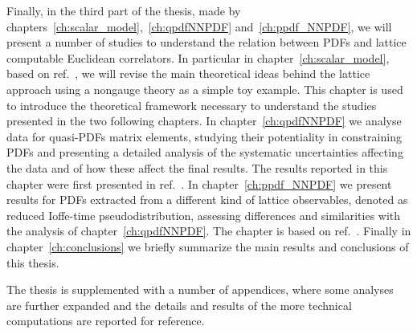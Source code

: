 %
Finally, in the third part of the thesis, made by chapters~\ref{ch:scalar_model},~\ref{ch:qpdfNNPDF} and~\ref{ch:ppdf_NNPDF}, 
we will present a number of studies to understand the relation between PDFs and lattice computable
Euclidean correlators.
In particular in chapter~\ref{ch:scalar_model}, based on ref.~\cite{DelDebbio:2020cbz},
we will revise the main theoretical ideas behind the lattice approach
using a nongauge theory as a simple toy example. This chapter is used to introduce the theoretical framework necessary
to understand the studies presented in the two following chapters.
In chapter~\ref{ch:qpdfNNPDF} we analyse data for quasi-PDFs matrix elements, studying their potentiality
in constraining PDFs and presenting a detailed analysis of the systematic uncertainties affecting the data and of how
these affect the final results. The results reported in this chapter were first presented in ref.~\cite{Cichy:2019ebf}.
In chapter~\ref{ch:ppdf_NNPDF} we present results for PDFs extracted from a different kind of lattice 
observables, denoted as reduced Ioffe-time pseudodistribution, assessing differences and similarities with
the analysis of chapter~\ref{ch:qpdfNNPDF}. The chapter is based on ref.~\cite{DelDebbio:2020rgv}.
Finally in chapter~\ref{ch:conclusions} we briefly summarize the main results and conclusions of this thesis. 

The thesis is supplemented with a number of appendices, where some analyses are further expanded and 
the details and results of the more technical computations are reported for reference. 




